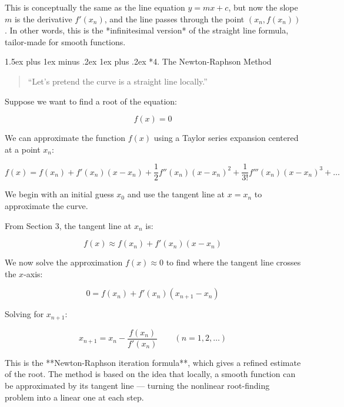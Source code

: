 \documentclass[10pt,twocolumn]{article}
\makeatletter
\renewcommand\section{%
  \@startsection{section}{1}{0pt}%
  {1.5ex plus 1ex minus .2ex}%
  {1ex plus .2ex}%
  {\normalfont\normalsize\bfseries}} %
\makeatother
\begin{document}
This is conceptually the same as the line equation \( y = mx + c \), but now the slope \( m \) is the derivative \( f'(x_n) \), and the line passes through the point \( (x_n, f(x_n)) \). In other words, this is the *infinitesimal version* of the straight line formula, tailor-made for smooth functions.

\vspace{0.3cm}

\section*{4. The Newton-Raphson Method}

\begin{quote}
“Let’s pretend the curve is a straight line locally.”
\end{quote}

Suppose we want to find a root of the equation:

\[
f(x) = 0
\]

We can approximate the function \( f(x) \) using a Taylor series expansion centered at a point \( x_n \):

{\footnotesize
\begin{equation}
f(x) = f(x_n) + f'(x_n)(x - x_n) + \frac{1}{2} f''(x_n)(x - x_n)^2 + \frac{1}{3!} f'''(x_n)(x - x_n)^3 + \dots
\end{equation}
}

We begin with an initial guess \( x_0 \) and use the tangent line at \( x = x_n \) to approximate the curve.

From Section 3, the tangent line at \( x_n \) is:

\[
f(x) \approx f(x_n) + f'(x_n)(x - x_n)
\]

We now solve the approximation \( f(x) \approx 0 \) to find where the tangent line crosses the \( x \)-axis:

\[
0 = f(x_n) + f'(x_n)(x_{n+1} - x_n)
\]

Solving for \( x_{n+1} \):

\begin{equation}
x_{n+1} = x_n - \frac{f(x_n)}{f'(x_n)} \qquad (n = 1, 2, \dots)
\end{equation}

This is the **Newton-Raphson iteration formula**, which gives a refined estimate of the root. The method is based on the idea that locally, a smooth function can be approximated by its tangent line — turning the nonlinear root-finding problem into a linear one at each step.
\end{document}
